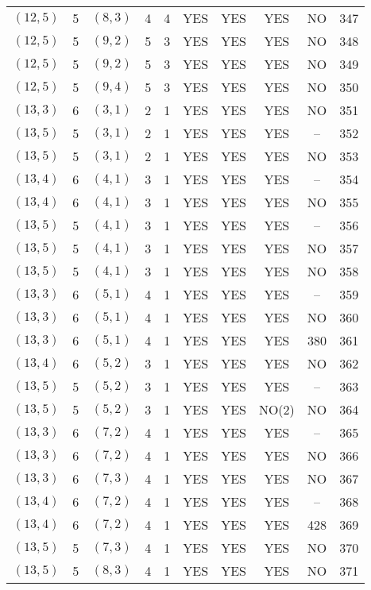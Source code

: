 \begin{longtable}{|c|c|c|c|c|c|c|c|c|c|}
$(12, 5)$ & 5 & $(8, 3)$ & 4 & 4 & YES & YES & YES & NO & 347\\
$(12, 5)$ & 5 & $(9, 2)$ & 5 & 3 & YES & YES & YES & NO & 348\\
$(12, 5)$ & 5 & $(9, 2)$ & 5 & 3 & YES & YES & YES & NO & 349\\
$(12, 5)$ & 5 & $(9, 4)$ & 5 & 3 & YES & YES & YES & NO & 350\\
$(13, 3)$ & 6 & $(3, 1)$ & 2 & 1 & YES & YES & YES & NO & 351\\
$(13, 5)$ & 5 & $(3, 1)$ & 2 & 1 & YES & YES & YES & -- & 352\\
$(13, 5)$ & 5 & $(3, 1)$ & 2 & 1 & YES & YES & YES & NO & 353\\
$(13, 4)$ & 6 & $(4, 1)$ & 3 & 1 & YES & YES & YES & -- & 354\\
$(13, 4)$ & 6 & $(4, 1)$ & 3 & 1 & YES & YES & YES & NO & 355\\
$(13, 5)$ & 5 & $(4, 1)$ & 3 & 1 & YES & YES & YES & -- & 356\\
$(13, 5)$ & 5 & $(4, 1)$ & 3 & 1 & YES & YES & YES & NO & 357\\
$(13, 5)$ & 5 & $(4, 1)$ & 3 & 1 & YES & YES & YES & NO & 358\\
$(13, 3)$ & 6 & $(5, 1)$ & 4 & 1 & YES & YES & YES & -- & 359\\
$(13, 3)$ & 6 & $(5, 1)$ & 4 & 1 & YES & YES & YES & NO & 360\\
$(13, 3)$ & 6 & $(5, 1)$ & 4 & 1 & YES & YES & YES & 380 & 361\\
$(13, 4)$ & 6 & $(5, 2)$ & 3 & 1 & YES & YES & YES & NO & 362\\
$(13, 5)$ & 5 & $(5, 2)$ & 3 & 1 & YES & YES & YES & -- & 363\\
$(13, 5)$ & 5 & $(5, 2)$ & 3 & 1 & YES & YES & NO(2) & NO & 364\\
$(13, 3)$ & 6 & $(7, 2)$ & 4 & 1 & YES & YES & YES & -- & 365\\
$(13, 3)$ & 6 & $(7, 2)$ & 4 & 1 & YES & YES & YES & NO & 366\\
$(13, 3)$ & 6 & $(7, 3)$ & 4 & 1 & YES & YES & YES & NO & 367\\
$(13, 4)$ & 6 & $(7, 2)$ & 4 & 1 & YES & YES & YES & -- & 368\\
$(13, 4)$ & 6 & $(7, 2)$ & 4 & 1 & YES & YES & YES & 428 & 369\\
$(13, 5)$ & 5 & $(7, 3)$ & 4 & 1 & YES & YES & YES & NO & 370\\
$(13, 5)$ & 5 & $(8, 3)$ & 4 & 1 & YES & YES & YES & NO & 371\\

\end{longtable}
